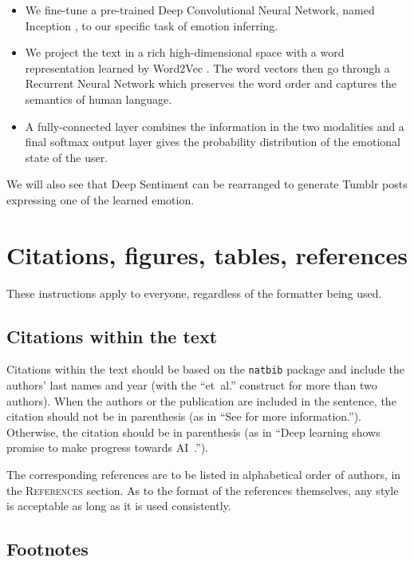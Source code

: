 \documentclass{article} %
\begin{document}
\begin{itemize}
    \item We fine-tune a pre-trained Deep Convolutional Neural Network, named Inception \citep{Szegedy-15}, to our specific task of emotion inferring.
    \item We project the text in a rich high-dimensional space with a word representation learned by Word2Vec \citep{Mikolov-13}. The word vectors then go through a Recurrent Neural Network which preserves the word order and captures the semantics of human language.
    \item A fully-connected layer combines the information in the two modalities and a final softmax output layer gives the probability distribution of the emotional state of the user.
\end{itemize}

We will also see that Deep Sentiment can be rearranged to generate Tumblr posts expressing one of the learned emotion.

\section{Citations, figures, tables, references}
\label{others}

These instructions apply to everyone, regardless of the formatter being used.

\subsection{Citations within the text}

Citations within the text should be based on the \texttt{natbib} package
and include the authors' last names and year (with the ``et~al.'' construct
for more than two authors). When the authors or the publication are
included in the sentence, the citation should not be in parenthesis (as
in ``See \citet{Hinton06} for more information.''). Otherwise, the citation
should be in parenthesis (as in ``Deep learning shows promise to make progress towards AI~\citep{Bengio+chapter2007}.'').

The corresponding references are to be listed in alphabetical order of
authors, in the \textsc{References} section. As to the format of the
references themselves, any style is acceptable as long as it is used
consistently.

\subsection{Footnotes}
\end{document}
